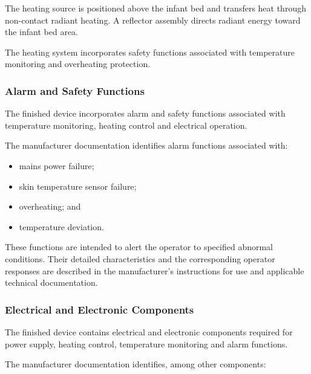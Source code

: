 The heating source is positioned above the infant bed and transfers
heat through non-contact radiant heating. A reflector assembly
directs radiant energy toward the infant bed area.

The heating system incorporates safety functions associated with
temperature monitoring and overheating protection.


\subsubsection{Alarm and Safety Functions}

The finished device incorporates alarm and safety functions
associated with temperature monitoring, heating control and
electrical operation.

The manufacturer documentation identifies alarm functions associated
with:

\begin{itemize}
    \item mains power failure;
    \item skin temperature sensor failure;
    \item overheating; and
    \item temperature deviation.
\end{itemize}

These functions are intended to alert the operator to specified
abnormal conditions. Their detailed characteristics and the
corresponding operator responses are described in the manufacturer's
instructions for use and applicable technical documentation.


\subsubsection{Electrical and Electronic Components}

The finished device contains electrical and electronic components
required for power supply, heating control, temperature monitoring
and alarm functions.

The manufacturer documentation identifies, among other components:

